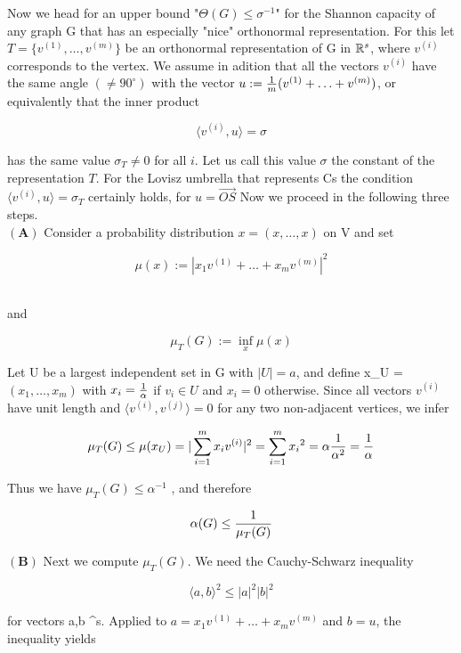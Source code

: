 \documentclass[12pt]{memoir}
\newcommand{\setnewpagemargins}{
    \clearpage
    \checkandfixthelayout
}
\begin{document}
\setnewpagemargins

Now we head for an upper bound "$\Theta(G) \leq \sigma^{-1}$" for the Shannon capacity
of any graph G that has an especially "nice" orthonormal representation.
For this let $T = \{v^{(1)},\ldots,v^{(m)}\}$ be an orthonormal representation 
of G in $\Bbb{R}^{s}$, where $v^{(i)}$ corresponds to the vertex. We assume in
adition that all the vectors $v^{(i)}$ have the same angle $(\neq 90^{\circ})$ with the
vector $u := {1 \over m}(v^{(1)}+\ldots+v^{(m)})$, or equivalently that the inner product 

\[
 \langle v^{(i)}, u\rangle  = \sigma 
\]

 has the same value $\sigma_T \neq 0$ for all $i$. Let us call this value $\sigma$ the constant
of the representation $T$. For the Lovisz umbrella that represents Cs the 
condition $\langle v^{(i)},u \rangle = \sigma_T$ certainly holds, for $u = \overrightarrow{OS}$
Now we proceed in the following three steps. 
\\$\mathbf{(A)}$ Consider a probability distribution $x = (x,\ldots, x)$ on V and set

\[
\mu(x) := |x_1v^{(1)}+\ldots+x_mv^{(m)}|^{2}
\]

\\and

\[
{\mu_{T}}(G) := \underset{x}{\inf}\mu(x)
\]

Let U be a largest independent set in G with $|U| = a$, and define x_U =
\\$(x_1,\ldots,x_m)$ with $x_i = {1 \over \alpha}$ if $v_i\in U$ and $x_i = 0$  otherwise. Since all 
vectors $v^{(i)}$  have unit length and $\langle v^{(i)}, v^{(j)} \rangle = 0$ for any two non-adjacent 
vertices, we infer

\[
\mu_T(G)\leq\mu(x_U)=|\sum_{i=1}^{m}x_iv^{(i)}\\|^2= \sum_{i=1}^{m} {x_i}^2 = \alpha {1 \over \alpha^{2}} = {1 \over \alpha}
\]

Thus we have $\mu_{T}(G) \leq \alpha^{-1}$ , and therefore

\[
\alpha(G) \leq {1 \over \mu_{T}(G)}
\]

$\mathbf{(B)}$ Next we compute ${\mu_T}(G)$. We need the Cauchy-Schwarz inequality

\[
\langle a,b \rangle^2 \leq |a|^2 |b|^2
\]

for vectors a,b \in {}^s. Applied to $a = x_{1}v^{(1)}+\ldots+x_{m}v^{(m)}$ and $b=u$,
the inequality yields
\end{document}
